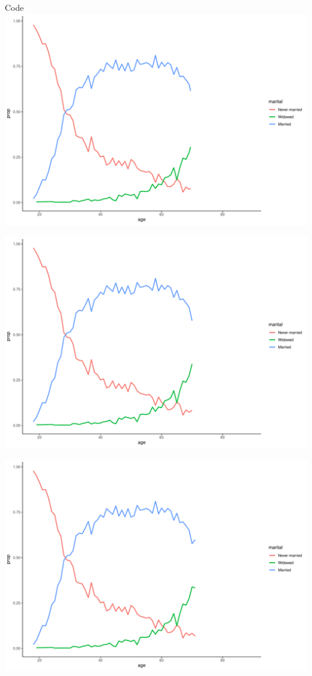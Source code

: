 \documentclass[
  ignorenonframetext,
]{beamer}
\begin{document}
\begin{frame}[fragile]{Code}
\includegraphics{gss_cat_files/figure-beamer/unnamed-chunk-1-77.pdf}

\includegraphics{gss_cat_files/figure-beamer/unnamed-chunk-1-78.pdf}

\includegraphics{gss_cat_files/figure-beamer/unnamed-chunk-1-79.pdf}


\end{frame}
\end{document}
